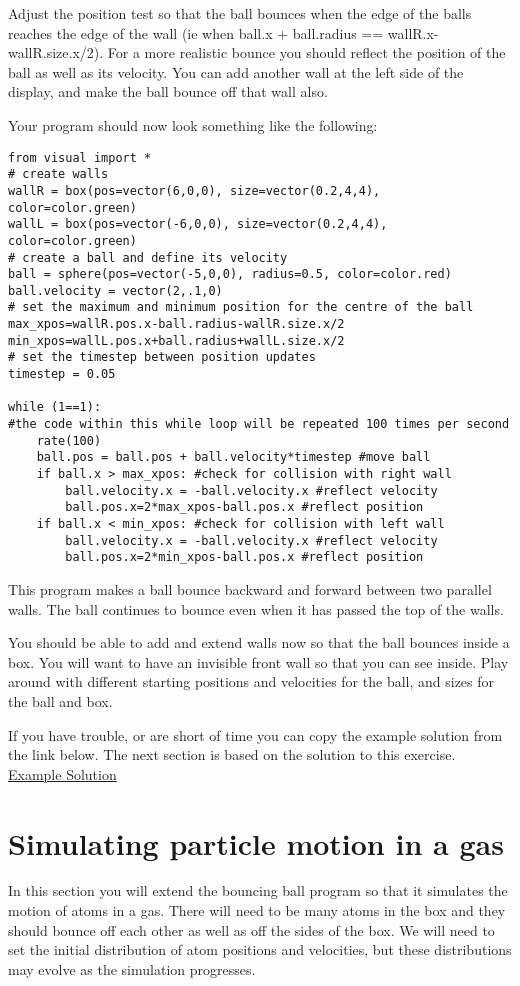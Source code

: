 \documentclass[a4paper]{letter}
\begin{document}
Adjust the position test so that the ball bounces when the edge of the balls reaches 
the edge of the wall (ie when {\color{code}ball.x + ball.radius == wallR.x-wallR.size.x/2}). 
For a more realistic bounce you should reflect the position of the ball as well as its velocity. 
You can add another wall at the left side of the display, and make the ball bounce off that wall also. 

Your program should now look something like the following: 
{\color{code}\begin{verbatim}
from visual import * 
# create walls
wallR = box(pos=vector(6,0,0), size=vector(0.2,4,4), color=color.green) 
wallL = box(pos=vector(-6,0,0), size=vector(0.2,4,4), color=color.green)
# create a ball and define its velocity
ball = sphere(pos=vector(-5,0,0), radius=0.5, color=color.red)  
ball.velocity = vector(2,.1,0) 
# set the maximum and minimum position for the centre of the ball
max_xpos=wallR.pos.x-ball.radius-wallR.size.x/2 
min_xpos=wallL.pos.x+ball.radius+wallL.size.x/2 
# set the timestep between position updates
timestep = 0.05 

while (1==1): 
#the code within this while loop will be repeated 100 times per second
    rate(100) 
    ball.pos = ball.pos + ball.velocity*timestep #move ball
    if ball.x > max_xpos: #check for collision with right wall
        ball.velocity.x = -ball.velocity.x #reflect velocity
        ball.pos.x=2*max_xpos-ball.pos.x #reflect position
    if ball.x < min_xpos: #check for collision with left wall
        ball.velocity.x = -ball.velocity.x #reflect velocity
        ball.pos.x=2*min_xpos-ball.pos.x #reflect position
\end{verbatim}}
This program makes a ball bounce backward and forward between two parallel walls. 
The ball continues to bounce even when it has  passed the top of the walls. 

You should be able to add and extend walls now so that the ball bounces inside a box. 
You will want to have an invisible front wall so that you can see inside. 
Play around with different starting positions and velocities for the ball, 
and sizes for the ball and box. 

If you have trouble, or are short of time you can copy the example solution from the link below.
The next section is based on the solution to this exercise.
\href{bounce2.html}{ Example Solution }

\section{Simulating particle motion in a gas}
In this section you will extend the bouncing ball program so that it simulates the motion 
of atoms in a gas. 
There will need to be many atoms in the box and they should bounce off each other as well
 as off the sides of the box.
We will need to set the initial distribution of atom positions and velocities, 
but these distributions may evolve as the simulation progresses.
\end{document}

